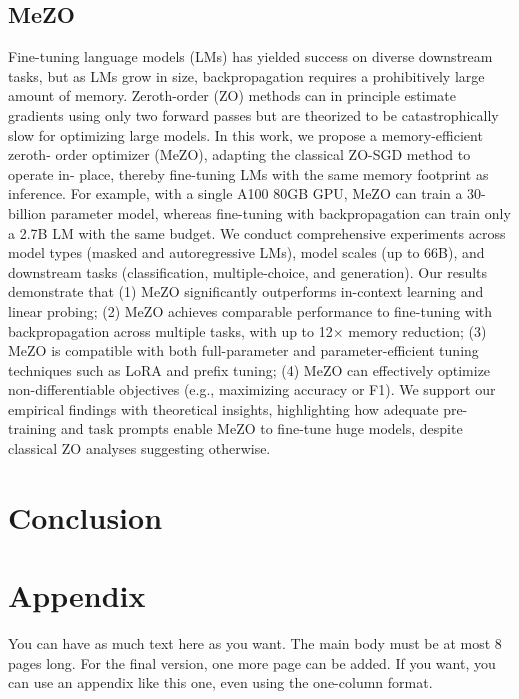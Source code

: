 \documentclass[nohyperref]{article}
\theoremstyle{plain}
\theoremstyle{definition}
\theoremstyle{remark}
\begin{document}
\subsection{MeZO}
Fine-tuning language models (LMs) has yielded success on diverse downstream
tasks, but as LMs grow in size, backpropagation requires a prohibitively large
amount of memory. Zeroth-order (ZO) methods can in principle estimate gradients
using only two forward passes but are theorized to be catastrophically slow for
optimizing large models. In this work, we propose a memory-efficient zeroth-
order optimizer (MeZO), adapting the classical ZO-SGD method to operate in-
place, thereby fine-tuning LMs with the same memory footprint as inference. For
example, with a single A100 80GB GPU, MeZO can train a 30-billion parameter
model, whereas fine-tuning with backpropagation can train only a 2.7B LM with
the same budget. We conduct comprehensive experiments across model types
(masked and autoregressive LMs), model scales (up to 66B), and downstream tasks
(classification, multiple-choice, and generation). Our results demonstrate that (1)
MeZO significantly outperforms in-context learning and linear probing; (2) MeZO
achieves comparable performance to fine-tuning with backpropagation across
multiple tasks, with up to 12× memory reduction; (3) MeZO is compatible with
both full-parameter and parameter-efficient tuning techniques such as LoRA and
prefix tuning; (4) MeZO can effectively optimize non-differentiable objectives (e.g.,
maximizing accuracy or F1). We support our empirical findings with theoretical
insights, highlighting how adequate pre-training and task prompts enable MeZO to
fine-tune huge models, despite classical ZO analyses suggesting otherwise.
\section{Conclusion}








\newpage
\appendix
\onecolumn
\section{Appendix}

You can have as much text here as you want. The main body must be at most $8$ pages long.
For the final version, one more page can be added.
If you want, you can use an appendix like this one, even using the one-column format.
\end{document}
